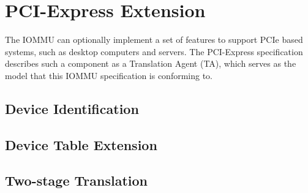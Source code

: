 
\section{PCI-Express Extension}

The IOMMU can optionally implement a set of features to support PCIe based systems, such
as desktop computers and servers. The PCI-Express specification describes such a component
as a Translation Agent (TA), which serves as the model that this IOMMU specification is
conforming to.

\subsection{Device Identification}

\subsection{Device Table Extension}

\subsection{Two-stage Translation}
